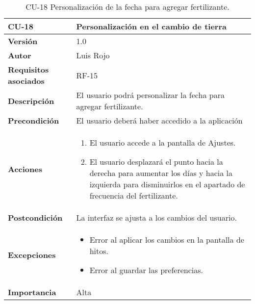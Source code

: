\begin{table}[p]
	\centering
	\begin{tabularx}{\linewidth}{ p{} p{} }
		\toprule
		\textbf{CU-18}    & \textbf{Personalización en el cambio de tierra}\\
		\toprule
		\textbf{Versión}              & 1.0    \\
		\textbf{Autor}                & Luis Rojo \\
		\textbf{Requisitos asociados} & RF-15 \\
		\textbf{Descripción}          & El usuario podrá personalizar la fecha para agregar fertilizante. \\
		\textbf{Precondición}         &  El usuario deberá haber accedido a la aplicación \\
		\textbf{Acciones}             &
		\begin{enumerate}
			\def\labelenumi{\arabic{enumi}.}
			\tightlist
			\item El usuario accede a la pantalla de Ajustes.
                \item El usuario desplazará el punto hacia la derecha para aumentar los días y hacia la izquierda para disminuirlos en el apartado de frecuencia del fertilizante.
		\end{enumerate}\\
		\textbf{Postcondición}        & La interfaz se ajusta a los cambios del usuario.  \\
		\textbf{Excepciones}          &  
            \begin{itemize}
                \item Error al aplicar los cambios en la pantalla de hitos.
                \item Error al guardar las preferencias.
            \end{itemize}
           \\
		\textbf{Importancia}          & Alta  \\
		\bottomrule
	\end{tabularx}
	\caption{CU-18 Personalización de la fecha para agregar fertilizante.}
\end{table}


